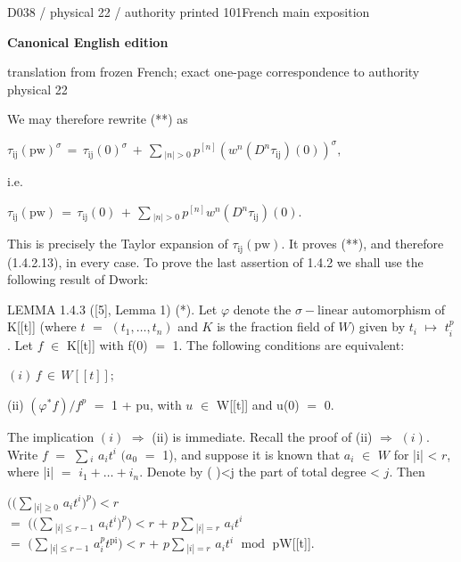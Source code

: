 \documentclass[9pt]{article}
\newcommand{\CanonText}[1]{\par{\fontsize{8.0}{9.35}\selectfont\RaggedRight #1\par}\vspace{2.2pt}}
\newcommand{\CanonDisplay}[1]{\par\vspace{1.2pt}\begin{center}{\fontsize{7.2}{8.4}\selectfont\(\displaystyle #1\)}\end{center}\vspace{1.2pt}}
\newcommand{\LayerTitle}{Canonical English edition}
\begin{document}
\newpage
\noindent\begin{minipage}[t][\dimexpr\textheight-5pt\relax][t]{\textwidth}
{\sffamily\fontsize{7.3}{8.2}\selectfont\color{Quiet} D038 / physical 22 / authority printed 101\hfill French main exposition}
\par{}\vspace{4.5pt}
{\sffamily\fontsize{10.4}{11.6}\selectfont\bfseries\color{Accent} \LayerTitle}
\par{\sffamily\fontsize{6.7}{7.7}\selectfont\color{Quiet} translation from frozen French; exact one-page correspondence to authority physical 22}
\vspace{5pt}
\CanonText{We may therefore rewrite (**) as}
\CanonDisplay{\tau{}_{\mathrm{ij}}(\text{pw})^\sigma{}\,=\,\tau{}_{\mathrm{ij}}(0)^\sigma{}\,+\,\sum{}_{|n|>0}\,p^{[n]}(w^{n}(D^{n}\tau{}_{\mathrm{ij}})(0))^\sigma{},}
\CanonText{i.e.}
\CanonDisplay{\tau{}_{\mathrm{ij}}(\text{pw})\,=\,\tau{}_{\mathrm{ij}}(0)\,+\,\sum{}_{|n|>0}\,p^{[n]}w^{n}(D^{n}\tau{}_{\mathrm{ij}})(0).}
\CanonText{This is precisely the Taylor expansion of \(\tau{}_{\mathrm{ij}}(\text{pw})\). It proves (**), and therefore (1.4.2.13), in every case. To prove the last assertion of 1.4.2 we shall use the following result of Dwork:}
\CanonText{LEMMA 1.4.3 ([5], Lemma 1) (*). Let \(\varphi{}\) denote the \(\sigma{}-\text{linear}\) automorphism of K[[t]] (where \(t\) \(=\) \((t_{1},\ldots{},t_{n})\) and \(K\) is the fraction field of \(W)\) given by \(t_{i}\) \(\mapsto{}\) \(t_{i}^{p}\). Let \(f\) \(\in{}\) K[[t]] with f(0) \(=\) 1. The following conditions are equivalent:}
\CanonDisplay{(i)\,f\,\in{}\,W[[t]];}
\CanonText{(ii) \((\varphi{}^{*}f)/f^{p}\) \(=\) 1 + pu, with \(u\) \(\in{}\) W[[t]] and u(0) \(=\) 0.}
\CanonText{The implication \((i)\) \(\Rightarrow{}\) (ii) is immediate. Recall the proof of (ii) \(\Rightarrow{}\) \((i)\). Write \(f\) \(=\) \(\sum{}_{i}\) \(a_{i}t^{i}\) \((a_{0}\) \(=\) 1), and suppose it is known that \(a_{i}\) \(\in{}\) \(W\) for |i| < \(r\), where |i| \(=\) \(i_{1}+\ldots{}+i_{n}\). Denote by ( )<j the part of total degree < \(j\). Then}
\CanonText{\(((\sum{}_{|i|\geq{}0}\) \(a_{i}t^{i})^{p})<r\)\\\(=\) \(((\sum{}_{|i|\leq{}r-1}\) \(a_{i}t^{i})^{p})<r\) + \(p\sum{}_{|i|=r}\) \(a_{i}t^{i}\)\\\(=\) \((\sum{}_{|i|\leq{}r-1}\) \(a_{i}^{p}t^{\mathrm{pi}})<r\) + \(p\sum{}_{|i|=r}\) \(a_{i}t^{i}\) \(\operatorname{mod}\) pW[[t]].}

\end{minipage}
\end{document}
